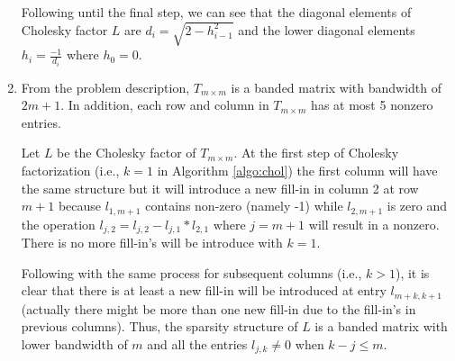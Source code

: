 \begin{enumerate}
Following until the final step, we can see that the diagonal elements of Cholesky factor $L$ are $d_{i} = \sqrt{2-h_{i-1}^{2}}$ and the lower diagonal elements $h_{i} = \frac{-1}{d_{i}}$ where $h_{0} = 0$.

\item From the problem description, $T_{m\times m}$ is a banded matrix with bandwidth of $2m+1$. In addition, each row and column in $T_{m\times m}$ has at most 5 nonzero entries. 

Let $L$ be the Cholesky factor of $T_{m\times m}$. At the first step of Cholesky factorization (i.e., $k=1$ in Algorithm \ref{algo:chol}) the first column will have the same structure but it will introduce a new fill-in in column 2 at row $m+1$ because $l_{1,m+1}$ contains non-zero (namely -1) while $l_{2, m+1}$ is zero and the operation $l_{j,2} = l_{j, 2} - l_{j,1}*l_{2,1} \text{\ where\ } j= m+1$ will result in a nonzero. There is no more fill-in's will be introduce with $k=1$. 

Following with the same process for subsequent columns (i.e., $k>1$), it is clear that there is at least a new fill-in will be introduced at entry $l_{m+k,k+1}$ (actually there might be more than one new fill-in due to the fill-in's in previous columns). Thus, the sparsity structure of $L$ is a banded matrix with lower bandwidth of $m$ and all the entries $l_{j,k} \neq 0$ when $k - j \leq m $.
\end{enumerate}